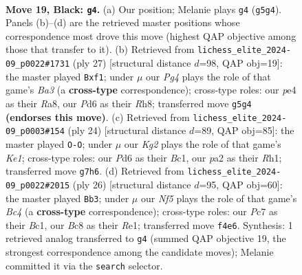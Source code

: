 \documentclass[11pt]{article}
\begin{document}
\clearpage

\begin{figure}[p]\centering
\begin{subfigure}{0.46\textwidth}\centering
\resizebox{\linewidth}{!}{%
\newchessgame
\chessboard[
  setfen={r1br4/ppp2pk1/3p4/4b1pp/N1P1Pn1q/4Q2P/PP3PP1/RBB2RK1 b - - 1 19},
  showmover=false,
  pgfstyle=straightmove, color=movearrow, markmove={g5-g4}
]}
\caption{}
\end{subfigure}\hfill
\begin{subfigure}{0.46\textwidth}\centering
\resizebox{\linewidth}{!}{%
\newchessgame
\chessboard[
  setfen={r3k2r/2qn1ppp/bp2p3/b2pP3/3Q1P2/2P3N1/P1PB2PP/R3KB1R b KQkq - 3 14},
  showmover=false,
  pgfstyle=straightmove, color=movearrow, markmove={a6-f1}
]}
\caption{}
\end{subfigure}
\\[4pt]
\begin{subfigure}{0.46\textwidth}\centering
\resizebox{\linewidth}{!}{%
\newchessgame
\chessboard[
  setfen={r1b2knr/pp2qp2/3Np1p1/2Ppb2p/3p4/Q5P1/PP2PPBP/R1B1K2R w KQ - 0 13},
  showmover=false,
  pgfstyle=straightmove, color=movearrow, markmove={e1-g1}
]}
\caption{}
\end{subfigure}\hfill
\begin{subfigure}{0.46\textwidth}\centering
\resizebox{\linewidth}{!}{%
\newchessgame
\chessboard[
  setfen={r1b2rk1/1pq1bppp/p3pn2/8/2BN4/2P2Q2/PP3PPP/R1B1R1K1 w - - 3 14},
  showmover=false,
  pgfstyle=straightmove, color=movearrow, markmove={c4-b3}
]}
\caption{}
\end{subfigure}
\caption{\textbf{Move 19, Black: \texttt{g4}.} (a) Our position; Melanie plays \texttt{g4} (\texttt{g5g4}). Panels (b)--(d) are the retrieved master positions whose correspondence most drove this move (highest QAP objective among those that transfer to it). (b) Retrieved from \texttt{lichess\_elite\_2024-09\_p0022\#1731} (ply 27) [structural distance $d$=98, QAP obj=19]: the master played \texttt{Bxf1}; under $\mu$ our \emph{Pg4} plays the role of that game's \emph{Ba3} (a \textbf{cross-type} correspondence); cross-type roles: our \emph{p}e4 as their \emph{R}a8, our \emph{P}d6 as their \emph{R}h8; transferred move \texttt{g5g4} \textbf{(endorses this move)}. (c) Retrieved from \texttt{lichess\_elite\_2024-09\_p0003\#154} (ply 24) [structural distance $d$=89, QAP obj=85]: the master played \texttt{O-O}; under $\mu$ our \emph{Kg2} plays the role of that game's \emph{Ke1}; cross-type roles: our \emph{P}d6 as their \emph{B}c1, our \emph{p}a2 as their \emph{R}h1; transferred move \texttt{g7h6}. (d) Retrieved from \texttt{lichess\_elite\_2024-09\_p0022\#2015} (ply 26) [structural distance $d$=95, QAP obj=60]: the master played \texttt{Bb3}; under $\mu$ our \emph{Nf5} plays the role of that game's \emph{Bc4} (a \textbf{cross-type} correspondence); cross-type roles: our \emph{P}c7 as their \emph{B}c1, our \emph{B}c8 as their \emph{R}e1; transferred move \texttt{f4e6}. Synthesis: 1 retrieved analog transferred to \texttt{g4} (summed QAP objective 19, the strongest correspondence among the candidate moves); Melanie committed it via the \texttt{search} selector.}
\label{fig:thought-m37}
\end{figure}
\end{document}
